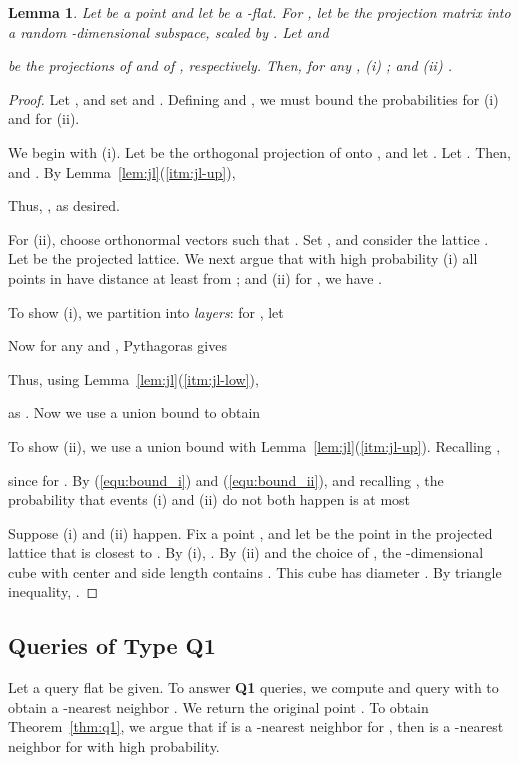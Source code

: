 \documentclass[a4paper,11pt]{paper}
\newtheorem{lemma}[theorem]{Lemma}
\begin{document}
\begin{lemma}\label{lem:jl-kflat}
  Let  be a point and let  be a -flat.
  For , let  be
  the projection matrix into a random -dimensional
  subspace, scaled by . Let  and
  
  be the projections of  and of , respectively.
  Then, for any ,
     (i)
         ; and (ii)
         .
\end{lemma}
\begin{proof}
  Let , and set  and .
  Defining  and ,
  we must bound the probabilities
   for (i) and
   for (ii).

  We begin with (i).  Let 
  be the orthogonal projection of  onto , and let
  .
  Let . Then,
   and .
  By Lemma~\ref{lem:jl}(\ref{itm:jl-up}),
  
  Thus, , as desired.

  For (ii),  choose  orthonormal vectors
   such that
  .
  Set , and
  consider the lattice
  .
  Let  be the projected lattice.
  We next argue that with high probability
  (i) all points in  have
  distance at least  from ; and (ii)
  for , we have .

  To show (i), we partition  into \emph{layers}: for
  , let
  
  Now for any  and
  ,
  Pythagoras gives
  
  Thus, using Lemma~\ref{lem:jl}(\ref{itm:jl-low}),
  
  as . Now we use a union bound to obtain
  
  To show (ii), we use a union bound with
  Lemma~\ref{lem:jl}(\ref{itm:jl-up}). Recalling
  ,
  
  since  for .
  By (\ref{equ:bound_i}) and (\ref{equ:bound_ii}), and recalling
  ,
  the probability that events (i) and (ii) do not both happen
  is at most
  
Suppose (i) and (ii) happen. Fix a point
, and let  be the point in the projected
lattice that is closest to .
By (i), .
By (ii)
and the choice of ,
the -dimensional cube with center  and side length
 contains . This cube has diameter
.
By triangle inequality,
.
\end{proof}

\subsection{Queries of Type Q1}
Let a query flat  be given.
To answer \textbf{Q1} queries, we compute  and query
 with  to obtain a -nearest
neighbor . We return the original point .
To obtain Theorem~\ref{thm:q1}, we argue that if  is a
-nearest neighbor for , then  is
a -nearest neighbor for  with high probability.
\end{document}
